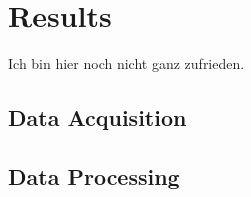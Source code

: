 \chapter{Results}\label{ch:results}
Ich bin hier noch nicht ganz zufrieden.
\section{Data Acquisition}\label{ch:results:sec:dataAcquisition}
\section{Data Processing}\label{ch:results:sec:dataProcessing}
